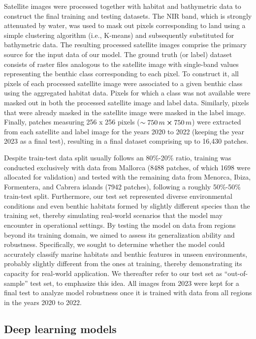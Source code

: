 Satellite images were processed together with habitat and bathymetric data to
construct the final training and testing datasets. The NIR band, which is
strongly attenuated by water, was used to mask out pixels corresponding to land
using a simple clustering algorithm (i.e., K-means) and subsequently
substituted
for bathymetric data. The resulting processed
satellite images comprise the primary source for the input data of our model.
The ground truth (or label) dataset consists of raster files analogous to the
satellite image with single-band values representing the benthic class
corresponding to each pixel. To construct it, all pixels of each processed
satellite image were associated to a given benthic class using the aggregated
habitat data. Pixels for which a class was not available were masked out in
both the processed satellite image and label data. Similarly, pixels that were
already masked in the satellite image were masked in the label image. Finally,
patches measuring 256 x 256 pixels ($\sim 750\,m \cross 750\,m$) were extracted
from each satellite and label image for the years 2020 to 2022 (keeping the
year 2023 as a final test), resulting in a final dataset comprising up to
16,430 patches.

Despite train-test data split usually follows an 80\%-20\% ratio, training was
conducted exclusively with data from Mallorca (8488
patches, of which 1698 were allocated for validation) and tested with the
remaining data from Menorca, Ibiza, Formentera, and Cabrera islands (7942
patches), following a roughly 50\%-50\% train-test split. Furthermore, our
test set represented diverse environmental conditions and even benthic habitats
formed by slightly different species than the training set, thereby simulating
real-world scenarios that the model may encounter in operational settings. By
testing the model on data from regions beyond its training domain, we aimed to
assess its generalization ability and robustness. Specifically, we sought to
determine whether the model could accurately classify marine habitats and
benthic features in unseen environments, probably slightly different from the
ones at training, thereby demonstrating its capacity for real-world
application. We thereafter refer to our test set as ``out-of-sample'' test set,
to emphasize this idea. All images from 2023 were kept for a final test to
analyze model robustness once it is trained with data from all regions in the
years 2020 to 2022.

\subsection{Deep learning models}


